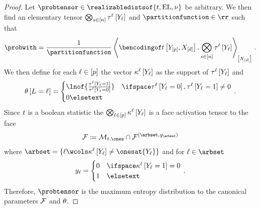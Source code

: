 \begin{proof}
    Let $\probtensor\in\realizabledistsof{\hlnstat,\elgraph,\basemeasure}$ be arbitrary.
    We then find an elementary tensor $\bigotimes_{s\in[n]}\tau^{\ell}\left[Y_{\ell}\right]$ and $\partitionfunction\in\rr$ such that
    \begin{align*}
        \probwith
        = \frac{1}{\partitionfunction} \contractionof{\bencsstatwith,\bigotimes_{\selenumeratorin}\hypercoreofat{\selindex}{\headvariableof{\selindex}}}{\shortcatvariables} \, .
    \end{align*}
    We then define for each $\ell\in[p]$ the vector $\kappa^{\ell}\left[Y_{\ell}\right]$ as the support of $\tau^{\ell}\left[Y_{\ell}\right]$ and
    \begin{align*}
        \weightparamat{\indexedselvariable}
        = \begin{cases}
              \lnof{\frac{\hypercoreofat{\selindex}{\headvariableof{\selindex}=1}}{\hypercoreofat{\selindex}{\headvariableof{\selindex}=0}}} & \ifspace \hypercoreofat{\selindex}{\headvariableof{\selindex}=0},\hypercoreofat{\selindex}{\headvariableof{\selindex}=1} \neq 0 \\
              0 \elsetext
        \end{cases} \, .
    \end{align*}
    Since $t$ is a boolean statistic the $\bigotimes_{\ell\in[p]}\kappa^{\ell}\left[Y_{\ell}\right]$ is a face activation tensor to the face
    \begin{align*}
        \facesymbol \coloneqq \hlnmeanset \cap \facesymbolof{(\arbset,\headindexof{\arbset})}
    \end{align*}
    where $\arbset=\{\selindex\wcols\kcoreofat{\selindex}{\headvariableof{\selindex}}\neq \onesat{\headvariableof{\selindex}}\}$ and for $\selindex\in\arbset$
    \begin{align*}
        \headindexof{\selindex}
        = \begin{cases}
              0 & \ifspace \kcoreofat{\selindex}{\headvariableof{\selindex}=1} = 0 \\
              1 & \elsetext
        \end{cases} \, .
    \end{align*}
    Therefore, $\probtensor$ is the maximum entropy distribution to the canonical parameters $\mathcal{F}$ and $\theta$.
\end{proof}

